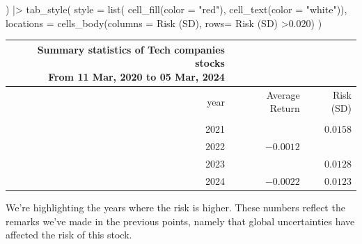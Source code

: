 \documentclass[
  letterpaper,
  DIV=11,
  numbers=noendperiod]{scrreprt}
\newenvironment{Shaded}{\begin{snugshade}}{\end{snugshade}}
\newcommand{\AttributeTok}[1]{\textcolor[rgb]{0.40,0.45,0.13}{#1}}
\newcommand{\FloatTok}[1]{\textcolor[rgb]{0.68,0.00,0.00}{#1}}
\newcommand{\FunctionTok}[1]{\textcolor[rgb]{0.28,0.35,0.67}{#1}}
\newcommand{\NormalTok}[1]{\textcolor[rgb]{0.00,0.23,0.31}{#1}}
\newcommand{\SpecialCharTok}[1]{\textcolor[rgb]{0.37,0.37,0.37}{#1}}
\newcommand{\StringTok}[1]{\textcolor[rgb]{0.13,0.47,0.30}{#1}}
\theoremstyle{definition}
\theoremstyle{remark}
\begin{document}
\begin{Shaded}
\begin{Highlighting}[]
\NormalTok{  ) }\SpecialCharTok{|\textgreater{}} 
  \FunctionTok{tab\_style}\NormalTok{(}
    \AttributeTok{style =} \FunctionTok{list}\NormalTok{(}
      \FunctionTok{cell\_fill}\NormalTok{(}\AttributeTok{color =} \StringTok{"red"}\NormalTok{), }
      \FunctionTok{cell\_text}\NormalTok{(}\AttributeTok{color =} \StringTok{"white"}\NormalTok{)), }
    \AttributeTok{locations =} 
      \FunctionTok{cells\_body}\NormalTok{(}\AttributeTok{columns =} \StringTok{\textasciigrave{}}\AttributeTok{Risk (SD)}\StringTok{\textasciigrave{}}\NormalTok{, }
                 \AttributeTok{rows=} \StringTok{\textasciigrave{}}\AttributeTok{Risk (SD)}\StringTok{\textasciigrave{}} \SpecialCharTok{\textgreater{}}\FloatTok{0.020}\NormalTok{)}
\NormalTok{  )}
\end{Highlighting}
\end{Shaded}

\begin{longtable*}{rrr}
\caption*{
{\large Summary statistics of Tech companies stocks} \\ 
{\small From 11 Mar, 2020 to 05 Mar, 2024}
} \\ 
\toprule
year & Average Return & Risk (SD) \\ 
\midrule{} &  &  \\ 
2021 &  & $0.0158$ \\ 
2022 & $-0.0012$ &  \\ 
2023 &  & $0.0128$ \\ 
2024 & $-0.0022$ & $0.0123$ \\ 
\bottomrule
\end{longtable*}

\begin{tcolorbox}[enhanced jigsaw, leftrule=.75mm, toprule=.15mm, arc=.35mm, colbacktitle=quarto-callout-important-color!10!white, opacityback=0, title=\textcolor{quarto-callout-important-color}{\faExclamation}\hspace{0.5em}{Look at the years (again)!}, breakable, bottomrule=.15mm, bottomtitle=1mm, colframe=quarto-callout-important-color-frame, colback=white, toptitle=1mm, left=2mm, titlerule=0mm, rightrule=.15mm, opacitybacktitle=0.6, coltitle=black]

We're highlighting the years where the risk is higher. These numbers
reflect the remarks we've made in the previous points, namely that
global uncertainties have affected the risk of this stock.

\end{tcolorbox}
\end{document}
